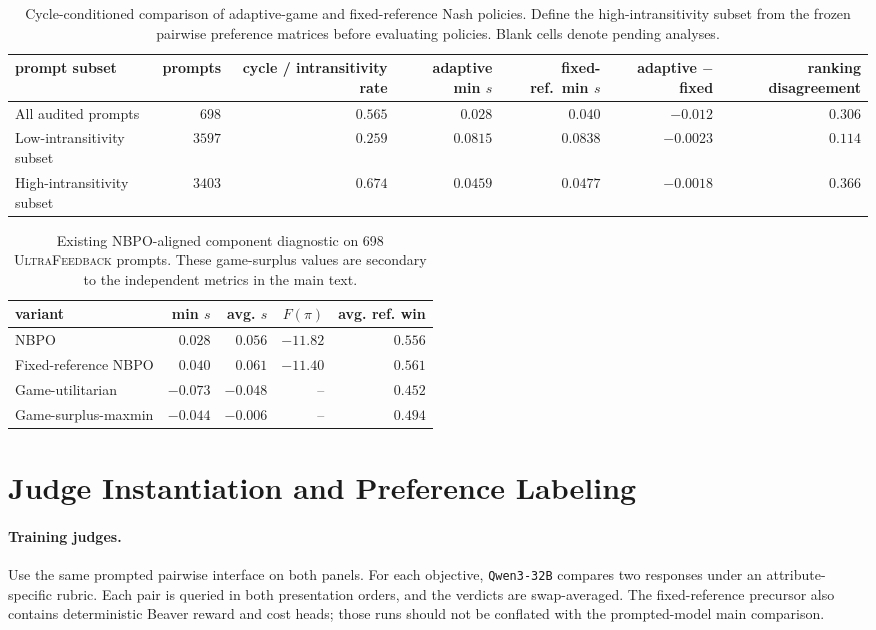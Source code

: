\documentclass{article}
\theoremstyle{remark}
\theoremstyle{plain}
\newcommand{\NBPO}{\textsc{NBPO}}
\begin{document}
\begin{table}[t]
\centering\scriptsize
\setlength{\tabcolsep}{2.8pt}
\caption{Cycle-conditioned comparison of adaptive-game and fixed-reference Nash policies. Define the high-intransitivity subset from the frozen pairwise preference matrices before evaluating policies. Blank cells denote pending analyses.}
\label{tab:cycle-conditioned}
\begin{tabular}{lrrrrrr}
\toprule
prompt subset & prompts & cycle / intransitivity rate & adaptive min $s$ & fixed-ref.\ min $s$ & adaptive $-$ fixed & ranking disagreement\\
\midrule
All audited prompts & 698 & $0.565$ & $0.028$ & $0.040$ & $-0.012$ & $0.306$ \\
Low-intransitivity subset & $3597$ & $0.259$ & $0.0815$ & $0.0838$ & $-0.0023$ & $0.114$ \\
High-intransitivity subset & $3403$ & $0.674$ & $0.0459$ & $0.0477$ & $-0.0018$ & $0.366$ \\
\bottomrule
\end{tabular}
\end{table}

\begin{table}[t]
\centering\footnotesize
\setlength{\tabcolsep}{3.0pt}
\caption{Existing NBPO-aligned component diagnostic on 698 \textsc{UltraFeedback} prompts. These game-surplus values are secondary to the independent metrics in the main text.}
\label{tab:component-game-diagnostic}
\begin{tabular}{lrrrr}
\toprule
variant & min $s$ & avg. $s$ & $F(\pi)$ & avg. ref. win\\
\midrule
\NBPO{} & $0.028$ & $0.056$ & $-11.82$ & $0.556$\\
Fixed-reference NBPO & $0.040$ & $0.061$ & $-11.40$ & $0.561$\\
Game-utilitarian & $-0.073$ & $-0.048$ & -- & $0.452$\\
Game-surplus-maxmin & $-0.044$ & $-0.006$ & -- & $0.494$\\
\bottomrule
\end{tabular}
\end{table}

\section{Judge Instantiation and Preference Labeling}
\label{app:labeling}
\paragraph{Training judges.}
Use the same prompted pairwise interface on both panels. For each objective, \texttt{Qwen3-32B} compares two responses under an attribute-specific rubric. Each pair is queried in both presentation orders, and the verdicts are swap-averaged. The fixed-reference precursor also contains deterministic Beaver reward and cost heads; those runs should not be conflated with the prompted-model main comparison.
\end{document}
